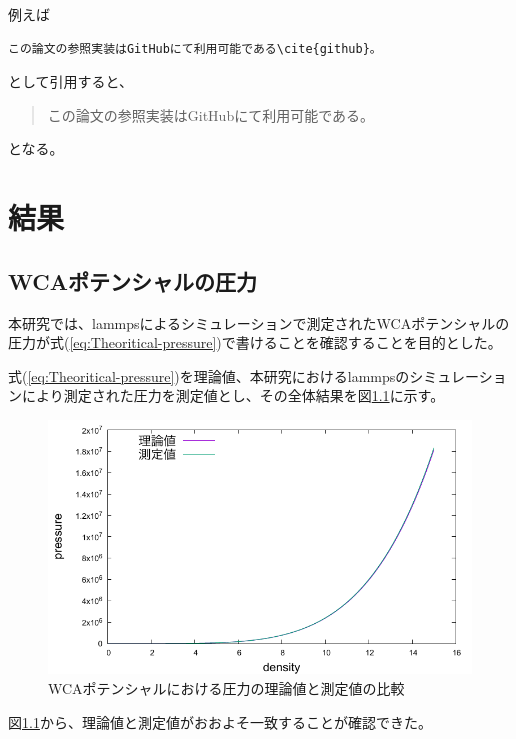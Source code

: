 \documentclass[titlepage]{jsreport}
\begin{document}
例えば

\begin{verbatim}
この論文の参照実装はGitHubにて利用可能である\cite{github}。
\end{verbatim}
として引用すると、

\begin{quotation}
    この論文の参照実装はGitHubにて利用可能である\cite{github}。
\end{quotation}
となる。




\chapter{結果} \label{chap:results}

\section{WCAポテンシャルの圧力}\label{results-sec:WCA-press}
本研究では、lammpsによるシミュレーションで測定されたWCAポテンシャルの圧力が式(\ref{eq:Theoritical-pressure})で書けることを確認することを目的とした。

式(\ref{eq:Theoritical-pressure})を理論値、本研究におけるlammpsのシミュレーションにより測定された圧力を測定値とし、その全体結果を図\ref{fig:compare:den-pre}に示す。

\begin{figure}[htbp]
    \begin{center}
        \includegraphics[width=14cm]{fig/compare:den-pre.pdf}
    \end{center}
    \caption{WCAポテンシャルにおける圧力の理論値と測定値の比較}
    \label{fig:compare:den-pre}
\end{figure}

図\ref{fig:compare:den-pre}から、理論値と測定値がおおよそ一致することが確認できた。
\end{document}
